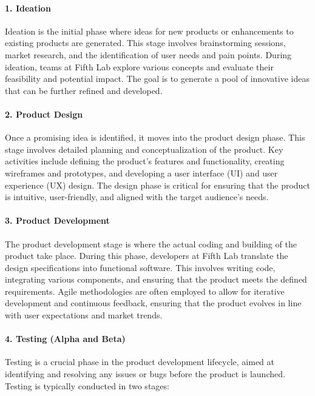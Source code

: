\documentclass[a4paper,12pt]{report}
\begin{document}
	\paragraph{1. Ideation}
	Ideation is the initial phase where ideas for new products or enhancements to existing products are generated. This stage involves brainstorming sessions, market research, and the identification of user needs and pain points. During ideation, teams at Fifth Lab explore various concepts and evaluate their feasibility and potential impact. The goal is to generate a pool of innovative ideas that can be further refined and developed.
	
	\paragraph{2. Product Design}
	Once a promising idea is identified, it moves into the product design phase. This stage involves detailed planning and conceptualization of the product. Key activities include defining the product’s features and functionality, creating wireframes and prototypes, and developing a user interface (UI) and user experience (UX) design. The design phase is critical for ensuring that the product is intuitive, user-friendly, and aligned with the target audience’s needs.
	
	\paragraph{3. Product Development}
	The product development stage is where the actual coding and building of the product take place. During this phase, developers at Fifth Lab translate the design specifications into functional software. This involves writing code, integrating various components, and ensuring that the product meets the defined requirements. Agile methodologies are often employed to allow for iterative development and continuous feedback, ensuring that the product evolves in line with user expectations and market trends.
	
	\paragraph{4. Testing (Alpha and Beta)}
	Testing is a crucial phase in the product development lifecycle, aimed at identifying and resolving any issues or bugs before the product is launched. Testing is typically conducted in two stages:
	
\end{document}
